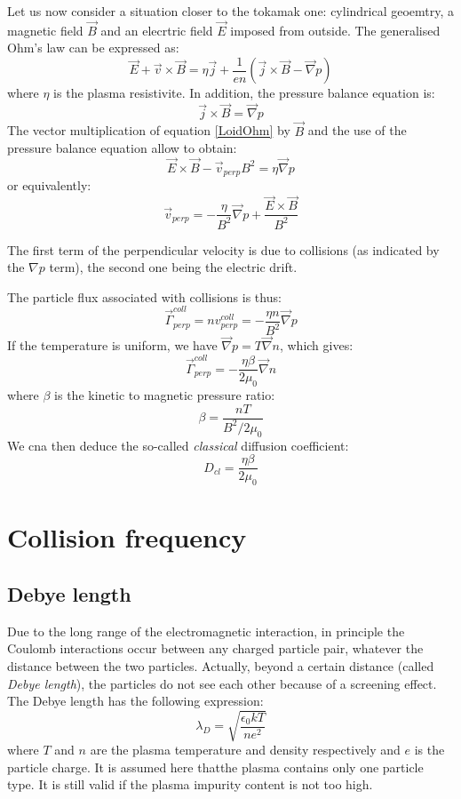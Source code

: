 Let us now consider a situation closer to the tokamak one: cylindrical geoemtry, a magnetic field $\vec{B}$ and an elecrtric field $\vec{E}$ imposed from outside. The generalised Ohm's law can be expressed as:
\begin{equation}
	\vec{E} + \vec{v}\times\vec{B} = \eta\vec{j} + \frac{1}{en}\left( \vec{j}\times\vec{B} - \vec{\nabla}p \right)
	\label{LoidOhm}
\end{equation}
where $\eta$ is the plasma resistivite.
In addition, the pressure balance equation is:
\[
	\vec{j}\times\vec{B} = \vec{\nabla}p
\]
The vector multiplication of equation \ref{LoidOhm} by $\vec{B}$ and the use of the pressure balance equation allow to obtain:
\[
	\vec{E}\times\vec{B} - \vec{v}_{perp}B^2 = \eta\vec{\nabla}p
\]
or equivalently:
\[
		\vec{v}_{perp} = -\frac{\eta}{B^2}\vec{\nabla}p + \frac{\vec{E}\times\vec{B}}{B^2}
\]
 
The first term of the perpendicular velocity is due to collisions (as indicated by the $\nabla p$ term), the second one being the electric drift.

The particle flux associated with collisions is thus:
\[
	\vec{\Gamma}_{perp}^{coll} = nv_{perp}^{coll} = -\frac{\eta n}{B^2}\vec{\nabla} p
\]
If the temperature is uniform, we have $\vec{\nabla}p = T\vec{\nabla}n$, which gives:
\[
\vec{\Gamma}_{perp}^{coll} = -\frac{\eta \beta}{2\mu_0}\vec{\nabla}n
\]
where $\beta$ is the kinetic to magnetic pressure ratio:
\[
	\beta = \frac{nT}{B^2/2\mu_0}
\]
We cna then deduce the so-called \textit{classical} diffusion coefficient:
\[
		D_{cl} = \frac{\eta\beta}{2\mu_0}
\]



		
		\section{Collision frequency}
		\label{sub:FrequenceDeCollision}
			
			
				\subsection{Debye length}
				\label{subsub:LongueurDeDebye}


Due to the long range of the electromagnetic interaction, in principle the Coulomb interactions occur between any charged particle pair, whatever the distance between the two particles. Actually, beyond a certain distance (called \textit{Debye length}), the particles do not see each other because of a screening effect. The Debye length has the following expression:
\begin{equation}
		\lambda_D = \sqrt{\frac{\epsilon_0 kT}{n e^2}}
		\label{Debye}
\end{equation}
where $T$ and $n$ are the plasma temperature and density respectively and $e$ is the particle charge. It is assumed here thatthe plasma contains only one particle type. It is still valid if the plasma impurity content is not too high.

